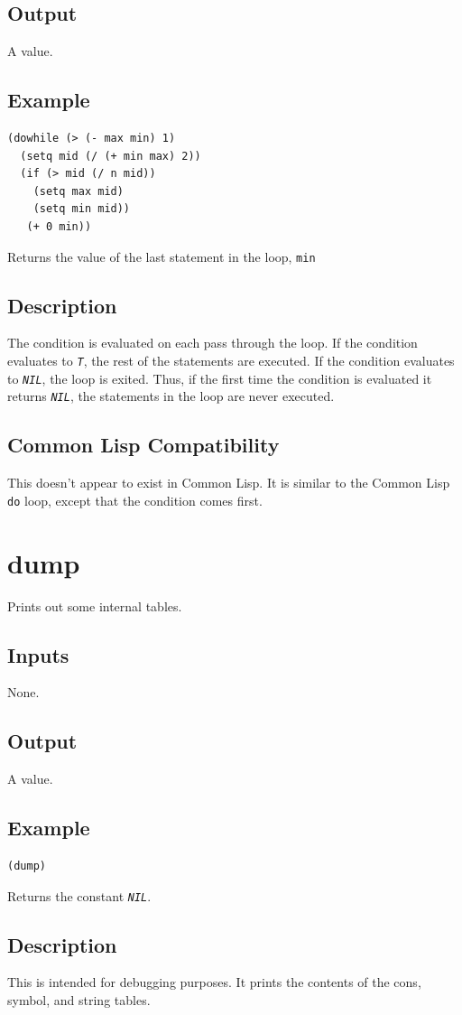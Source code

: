 \documentclass[10pt, openany]{book}
\newcommand{\constant}[1]{\emph{\texttt{#1}}}
\newcommand{\keyword}[1]{\texttt{#1}}
\newcommand{\cl}{Common Lisp}
\begin{document}
\subsection{Output}
A value.
\subsection{Example}
\begin{lstlisting}
(dowhile (> (- max min) 1)
  (setq mid (/ (+ min max) 2))
  (if (> mid (/ n mid))
    (setq max mid)
    (setq min mid))
   (+ 0 min))
\end{lstlisting}
Returns the value of the last statement in the loop, \keyword{min}
\subsection{Description}
The condition is evaluated on each pass through the loop.  If the condition evaluates to \constant{T}, the rest of the statements are executed.  If the condition evaluates to \constant{NIL}, the loop is exited.  Thus, if the first time the condition is evaluated it returns \constant{NIL}, the statements in the loop are never executed.
\subsection{Common Lisp Compatibility}
This doesn't appear to exist in \cl.  It is similar to the \cl{} \keyword{do} loop, except that the condition comes first.

\section{dump}
Prints out some internal tables.
\subsection{Inputs}
None.
\subsection{Output}
A value.
\subsection{Example}
\begin{lstlisting}
(dump)
\end{lstlisting}
Returns the constant \constant{NIL}.
\subsection{Description}
This is intended for debugging purposes.  It prints the contents of the cons, symbol, and string tables.
\end{document}
